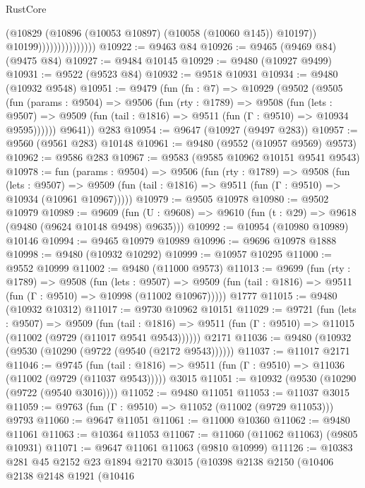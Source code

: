 \begin{lexlean}{RustCore}
\begin{coremodule}
                                  (@10829 (@10896 (@10053 @10897) (@10058 (@10060 @145)) @10197))
                                  @10199)))))))))))))))
@10922 := @9463 @84
@10926 := @9465 (@9469 @84) (@9475 @84)
@10927 := @9484 @10145
@10929 := @9480 (@10927 @9499)
@10931 := @9522 (@9523 @84)
@10932 := @9518 @10931
@10934 := @9480 (@10932 @9548)
@10951 := @9479
    (fun (fn : @7) =>
    @10929
      (@9502
        (@9505
          (fun (params : @9504) =>
          @9506
            (fun (rty : @1789) =>
            @9508
              (fun (lets : @9507) =>
              @9509 (fun (tail : @1816) => @9511 (fun (Γ : @9510) => @10934 @9595))))))
        @9641))
    @283
@10954 := @9647 (@10927 (@9497 @283))
@10957 := @9560 (@9561 @283) @10148
@10961 := @9480 (@9552 (@10957 @9569) @9573)
@10962 := @9586 @283
@10967 := @9583 (@9585 @10962 @10151 @9541 @9543)
@10978 := fun (params : @9504) =>
  @9506
    (fun (rty : @1789) =>
    @9508
      (fun (lets : @9507) =>
      @9509 (fun (tail : @1816) => @9511 (fun (Γ : @9510) => @10934 (@10961 @10967)))))
@10979 := @9505 @10978
@10980 := @9502 @10979
@10989 := @9609
    (fun (U : @9608) => @9610 (fun (t : @29) => @9618 (@9480 (@9624 @10148 @9498) @9635)))
@10992 := @10954 (@10980 @10989) @10146
@10994 := @9465 @10979 @10989
@10996 := @9696 @10978 @1888
@10998 := @9480 (@10932 @10292)
@10999 := @10957 @10295
@11000 := @9552 @10999
@11002 := @9480 (@11000 @9573)
@11013 := @9699
    (fun (rty : @1789) =>
    @9508
      (fun (lets : @9507) =>
      @9509 (fun (tail : @1816) => @9511 (fun (Γ : @9510) => @10998 (@11002 @10967)))))
    @1777
@11015 := @9480 (@10932 @10312)
@11017 := @9730 @10962 @10151
@11029 := @9721
    (fun (lets : @9507) =>
    @9509
      (fun (tail : @1816) =>
      @9511 (fun (Γ : @9510) => @11015 (@11002 (@9729 (@11017 @9541 @9543))))))
    @2171
@11036 := @9480 (@10932 (@9530 (@10290 (@9722 (@9540 (@2172 @9543))))))
@11037 := @11017 @2171
@11046 := @9745
    (fun (tail : @1816) => @9511 (fun (Γ : @9510) => @11036 (@11002 (@9729 (@11037 @9543)))))
    @3015
@11051 := @10932 (@9530 (@10290 (@9722 (@9540 @3016))))
@11052 := @9480 @11051
@11053 := @11037 @3015
@11059 := @9763 (fun (Γ : @9510) => @11052 (@11002 (@9729 @11053))) @9793
@11060 := @9647 @11051
@11061 := @11000 @10360
@11062 := @9480 @11061
@11063 := @10364 @11053
@11067 := @11060 (@11062 @11063) (@9805 @10931)
@11071 := @9647 @11061 @11063 (@9810 @10999)
@11126 := @10383
    @281
    @45
    @2152
    @23
    @1894
    @2170
    @3015
    (@10398
      @2138
      @2150
      (@10406
        @2138
        @2148
        @1921
        (@10416

\end{coremodule}
\end{lexlean}

